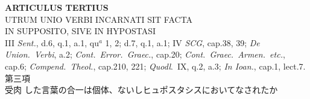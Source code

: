 \documentclass[paper=a4paper,fontsize=10pt,jafontsize=9pt,titlepage]{jlreq}
\begin{document}
{}
\setcounter{section}{3}
\setcounter{subsection}{0}
\begin{center}
{\Large {\bfseries ARTICULUS TERTIUS}}\\ {\large UTRUM UNIO VERBI INCARNATI
SIT FACTA \\IN SUPPOSITO, SIVE IN HYPOSTASI}\\ {\footnotesize III
{\itshape Sent.}, d.6, q.1, a.1, qu$^a$ 1, 2; d.7, q.1, a.1; IV
{\itshape SCG}, cap.38, 39; {\itshape De Union.~Verbi}, a.2; {\itshape
Cont.~Error.~Graec.}, cap.20; {\itshape Cont.~Graec.~Armen.~etc.},
cap.6; {\itshape Compend.~Theol.}, cap.210, 221; {\itshape Quodl}.~IX,
q.2, a.3; {\itshape In Ioan.}, cap.1, lect.7.}\\ {\Large 第三項\\受肉
した言葉の合一は個体、ないしヒュポスタシスにおいてなされたか}
\end{center}
\end{document}
